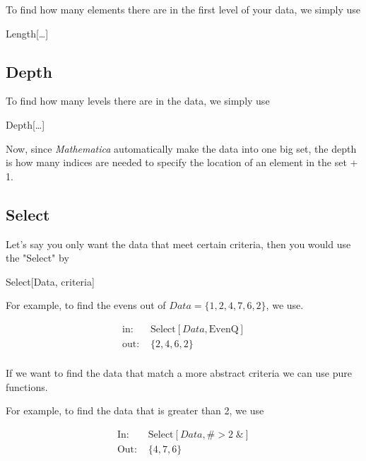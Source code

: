 \documentclass[11pt,a4paper,twoside]{article}
\begin{document}
				To find how many elements there are in the first level of your data, we simply use
					
				\begin{center} Length[\dots] \end{center}
					
			\subsection{Depth}
					
				To find how many levels there are in the data, we simply use
					
				\begin{center} Depth[\dots] \end{center}
					
				Now, since \textit{Mathematica} automatically make the data into one big set, the depth is how many indices are needed to specify the location of an element in the set + 1.
					
			\subsection{Select}
					
				Let's say you only want the data that meet certain criteria, then you would use the "Select" by
					
				\begin{center} Select[Data, criteria] \end{center}
					
				For example, to find the evens out of $ Data = \{1,2,4,7,6,2\} $, we use.
					
					\begin{align*}
						\text{in: }& \text{Select}[Data,\text{EvenQ}] \\
						\text{out: }& \{2,4,6,2\} \\
					\end{align*}
					
				If we want to find the data that match a more abstract criteria we can use pure functions.
					
				For example, to find the data that is greater than 2, we use
					
					\begin{align*}					
						\text{In: }& \text{Select} [Data,\# > 2 \; \& ] \\
						\text{Out: }& \{ 4,7,6 \} \\
					\end{align*}
					
\end{document}
